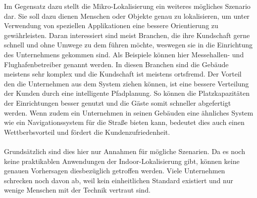Im Gegensatz dazu stellt die Mikro-Lokalisierung ein weiteres mögliches Szenario dar. Sie soll dazu dienen Menschen oder Objekte genau zu lokalisieren, um unter Verwendung von speziellen Applikationen eine bessere Orientierung zu gewährleisten. Daran interessiert sind meist Branchen, die ihre Kundschaft gerne schnell und ohne Umwege zu dem führen möchte, weswegen sie in die Einrichtung des Unternehmens gekommen sind. Als Beispiele können hier Messehallen- und Flughafenbetreiber genannt werden. In diesen Branchen sind die Gebäude meistens sehr komplex und die Kundschaft ist meistens ortsfremd. Der Vorteil den die Unternehmen aus dem System ziehen können, ist eine bessere Verteilung der Kunden durch eine intelligente Pfadplanung. So können die Platzkapazitäten der Einrichtungen besser genutzt und die Gäste somit schneller abgefertigt werden. Wenn zudem ein Unternehmen in seinen Gebäuden eine ähnliches System wie ein Navigationssystem für die Straße bieten kann, bedeutet dies auch einen Wettberbsvorteil und fördert die Kundenzufriedenheit. \\ \\
Grundsätzlich sind dies hier nur Annahmen für mögliche Szenarien. Da es noch keine praktikablen Anwendungen der Indoor-Lokalisierung gibt, können keine genauen Vorhersagen diesbezüglich getroffen werden. Viele Unternehmen schrecken noch davon ab, weil kein einheitlichen Standard existiert und nur wenige Menschen mit der Technik vertraut sind. \par\bigskip 
